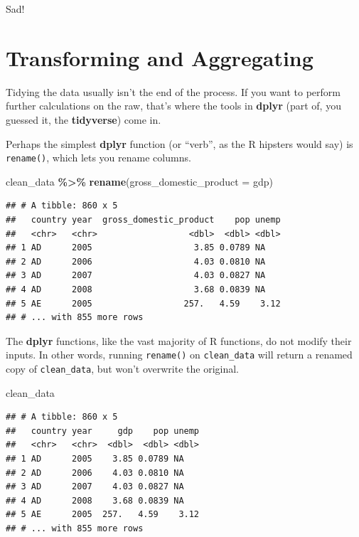 \documentclass[
  12pt,
  oneside,openany]{book}
\newenvironment{Shaded}{\begin{snugshade}}{\end{snugshade}}
\newcommand{\DataTypeTok}[1]{\textcolor[rgb]{0.13,0.29,0.53}{#1}}
\newcommand{\KeywordTok}[1]{\textcolor[rgb]{0.13,0.29,0.53}{\textbf{#1}}}
\newcommand{\NormalTok}[1]{#1}
\newcommand{\OperatorTok}[1]{\textcolor[rgb]{0.81,0.36,0.00}{\textbf{#1}}}
\newcommand{\StringTok}[1]{\textcolor[rgb]{0.31,0.60,0.02}{#1}}
\begin{document}
Sad!

\hypertarget{transforming-and-aggregating}{%
\section{Transforming and Aggregating}\label{transforming-and-aggregating}}

Tidying the data usually isn't the end of the process. If you want to perform further calculations on the raw, that's where the tools in \textbf{dplyr} (part of, you guessed it, the \textbf{tidyverse}) come in.

Perhaps the simplest \textbf{dplyr} function (or ``verb'', as the R hipsters would say) is \texttt{rename()}, which lets you rename columns.

\begin{Shaded}
\begin{Highlighting}[]
\NormalTok{clean\_data }\OperatorTok{\%>\%}
\StringTok{  }\KeywordTok{rename}\NormalTok{(}\DataTypeTok{gross\_domestic\_product =}\NormalTok{ gdp)}
\end{Highlighting}
\end{Shaded}

\begin{verbatim}
## # A tibble: 860 x 5
##   country year  gross_domestic_product    pop unemp
##   <chr>   <chr>                  <dbl>  <dbl> <dbl>
## 1 AD      2005                    3.85 0.0789 NA   
## 2 AD      2006                    4.03 0.0810 NA   
## 3 AD      2007                    4.03 0.0827 NA   
## 4 AD      2008                    3.68 0.0839 NA   
## 5 AE      2005                  257.   4.59    3.12
## # ... with 855 more rows
\end{verbatim}

The \textbf{dplyr} functions, like the vast majority of R functions, do not modify their inputs. In other words, running \texttt{rename()} on \texttt{clean\_data} will return a renamed copy of \texttt{clean\_data}, but won't overwrite the original.

\begin{Shaded}
\begin{Highlighting}[]
\NormalTok{clean\_data}
\end{Highlighting}
\end{Shaded}

\begin{verbatim}
## # A tibble: 860 x 5
##   country year     gdp    pop unemp
##   <chr>   <chr>  <dbl>  <dbl> <dbl>
## 1 AD      2005    3.85 0.0789 NA   
## 2 AD      2006    4.03 0.0810 NA   
## 3 AD      2007    4.03 0.0827 NA   
## 4 AD      2008    3.68 0.0839 NA   
## 5 AE      2005  257.   4.59    3.12
## # ... with 855 more rows
\end{verbatim}
\end{document}
